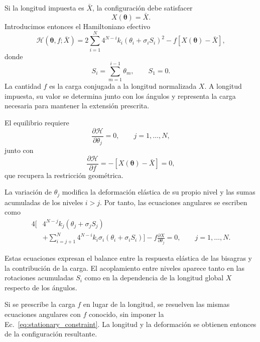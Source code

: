 \documentclass[11pt,a4paper]{article}
\begin{document}
Si la longitud impuesta es $\bar X$, la configuración debe
satisfacer
\begin{equation}
X(\boldsymbol{\theta})=\bar X.
\label{eq:length_constraint}
\end{equation}
Introducimos entonces el Hamiltoniano efectivo
\begin{equation}
\boxed{
\mathcal{H}(\boldsymbol{\theta},f;\bar X)
=
2\sum_{i=1}^{N}4^{N-i}k_i
(\theta_i+\sigma_i S_i)^2
-
f\left[X(\boldsymbol{\theta})-\bar X\right],
}
\label{eq:H_def_ki}
\end{equation}
donde
\begin{equation}
S_i=\sum_{m=1}^{i-1}\theta_m,
\qquad S_1=0.
\end{equation}
La cantidad $f$ es la carga conjugada a la longitud normalizada
$X$. A longitud impuesta, su valor se determina junto con los
ángulos y representa la carga necesaria para mantener
la extensión prescrita.

El equilibrio requiere
\begin{equation}
\frac{\partial\mathcal{H}}{\partial\theta_j}=0,
\qquad j=1,\ldots,N,
\label{eq:stationary}
\end{equation}
junto con
\begin{equation}
\frac{\partial\mathcal{H}}{\partial f}
=
-\left[X(\boldsymbol{\theta})-\bar X\right]=0,
\label{eq:stationary_constraint}
\end{equation}
que recupera la restricción geométrica.

La variación de $\theta_j$ modifica la deformación elástica
de su propio nivel y las sumas acumuladas de los niveles $i>j$.
Por tanto, las ecuaciones angulares se escriben como
\begin{equation}
\boxed{
\begin{aligned}
4\Bigg[
&4^{N-j}k_j(\theta_j+\sigma_j S_j)
\\
&+\sum_{i=j+1}^{N}
4^{N-i}k_i\sigma_i(\theta_i+\sigma_i S_i)
\Bigg]
-
f\frac{\partial X}{\partial\theta_j}
=0,
\qquad j=1,\ldots,N.
\end{aligned}
}
\label{eq:equilibrium_general}
\end{equation}

Estas ecuaciones expresan el balance entre la respuesta
elástica de las bisagras y la contribución de la carga.
El acoplamiento entre niveles aparece tanto en las rotaciones
acumuladas $S_i$ como en la dependencia de la longitud global
$X$ respecto de los ángulos.

Si se prescribe la carga $f$ en lugar de la longitud, se resuelven
las mismas ecuaciones angulares con $f$ conocido, sin imponer
la Ec.~\eqref{eq:stationary_constraint}. La longitud y la
deformación se obtienen entonces de la configuración resultante.
\end{document}
